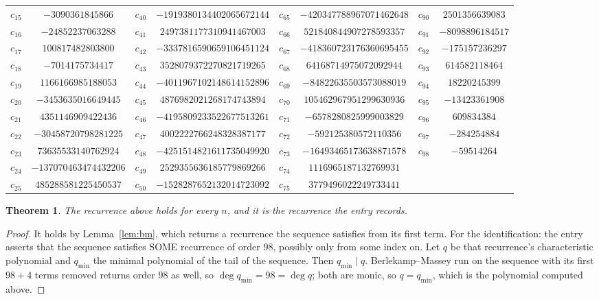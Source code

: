 \documentclass[11pt,a4paper]{article}
\theoremstyle{plain}
\newtheorem{theorem}{Theorem}
\theoremstyle{definition}
\begin{document}
\begin{center}
\begin{tabular}{cccccccc}
$c_{15}$ & $-3090361845866$ & $c_{40}$ & $-1919380134402065672144$ & $c_{65}$ & $-420347788967071462648$ & $c_{90}$ & $2501356639083$ \\
$c_{16}$ & $-24852237063288$ & $c_{41}$ & $2497381177310941467003$ & $c_{66}$ & $521840844907278593357$ & $c_{91}$ & $-8098896184517$ \\
$c_{17}$ & $100817482803800$ & $c_{42}$ & $-3337816590659106451124$ & $c_{67}$ & $-418360723176360695455$ & $c_{92}$ & $-175157236297$ \\
$c_{18}$ & $-7014175734417$ & $c_{43}$ & $3528079372270821719265$ & $c_{68}$ & $64168714975072092944$ & $c_{93}$ & $614582118464$ \\
$c_{19}$ & $1166166985188053$ & $c_{44}$ & $-4011967102148614152896$ & $c_{69}$ & $-84822635503573088019$ & $c_{94}$ & $18220245399$ \\
$c_{20}$ & $-3453635016649445$ & $c_{45}$ & $4876982021268174743894$ & $c_{70}$ & $105462967951299630936$ & $c_{95}$ & $-13423361908$ \\
$c_{21}$ & $4351146909422436$ & $c_{46}$ & $-4195809233522677513261$ & $c_{71}$ & $-6578280825999003829$ & $c_{96}$ & $609834384$ \\
$c_{22}$ & $-30458720798281225$ & $c_{47}$ & $4002222766248328387177$ & $c_{72}$ & $-592125380572110356$ & $c_{97}$ & $-284254884$ \\
$c_{23}$ & $73635533140762924$ & $c_{48}$ & $-4251514821611735049920$ & $c_{73}$ & $-16493465173638871578$ & $c_{98}$ & $-59514264$ \\
$c_{24}$ & $-137070463474432206$ & $c_{49}$ & $2529355636185779869266$ & $c_{74}$ & $1116965187132769931$ &  &  \\
$c_{25}$ & $485288581225450537$ & $c_{50}$ & $-1528287652132014723092$ & $c_{75}$ & $3779496022249733441$ &  &  \\
\end{tabular}
\end{center}

\begin{theorem}
The recurrence above holds for every $n$, and it is the recurrence the entry records.
\end{theorem}

\begin{proof}
It holds by Lemma~\ref{lem:bm}, which returns a recurrence the sequence satisfies from its
first term. For the identification: the entry asserts that the sequence satisfies SOME
recurrence of order $98$, possibly only from some index on. Let $q$ be that recurrence's
characteristic polynomial and $q_{\min}$ the minimal polynomial of the tail of the sequence.
Then $q_{\min}\mid q$. Berlekamp--Massey run on the sequence with its first $98+4$ terms
removed returns order $98$ as well, so $\deg q_{\min}=98=\deg q$; both are monic, so
$q=q_{\min}$, which is the polynomial computed above.
\end{proof}
\end{document}
